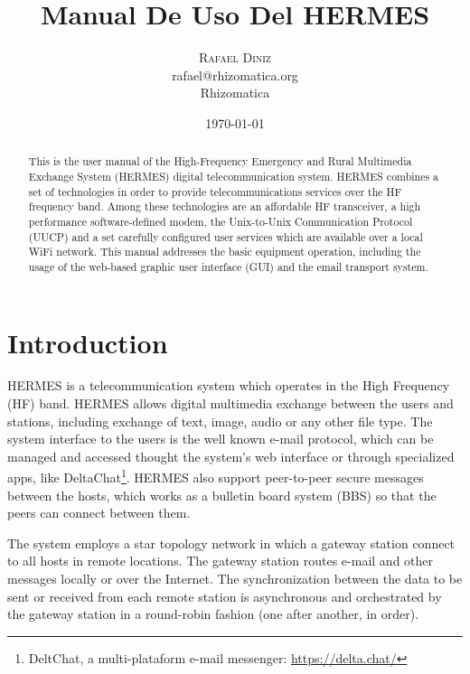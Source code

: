 \documentclass[11pt,a4paper]{article}
\title{Manual De Uso Del HERMES}
\author{
       \large
        \textsc{Rafael Diniz}
        \mbox{}\\ %
        rafael@rhizomatica.org\\
        \mbox{Rhizomatica} \\ %
}
\date{\today}
\begin{document}
\maketitle

\begin{abstract}

This is the user manual of the High-Frequency Emergency and Rural Multimedia Exchange System (HERMES) digital telecommunication system. HERMES combines a set of technologies in order to provide telecommunications services over the HF frequency band. Among these technologies are an affordable HF transceiver, a high performance software-defined modem, the Unix-to-Unix Communication Protocol (UUCP) and a set carefully configured user services which are available over a local WiFi network. This manual addresses the basic equipment operation, including the usage of the web-based graphic user interface (GUI) and the email transport system.

\end{abstract}

\newpage

\tableofcontents

\newpage

\tableofcontents

\setlength{\parindent}{0em}
\setlength{\parskip}{1em}

\section{Introduction}

HERMES is a telecommunication system which operates in the High Frequency (HF) band. HERMES allows digital multimedia exchange between the users and stations, including exchange of text, image, audio or any other file type. The system interface to the users is the well known e-mail protocol, which can be managed and accessed thought the system's web interface or through specialized apps, like DeltaChat\footnote{DeltChat, a multi-plataform e-mail messenger: \url{https://delta.chat/} }. HERMES also support peer-to-peer secure messages between the hosts, which works as a bulletin board system (BBS) so that the peers can connect between them.

The system employs a star topology network in which a gateway station connect to all hosts in remote locations. The gateway station routes e-mail and other messages locally or over the Internet. The synchronization between the data to be sent or received from each remote station is asynchronous and orchestrated by the gateway station in a round-robin fashion (one after another, in order).
\end{document}
